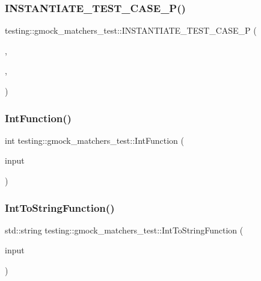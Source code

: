 \subsubsection{\texorpdfstring{INSTANTIATE\_TEST\_CASE\_P()}{INSTANTIATE\_TEST\_CASE\_P()}\hspace{0.1cm}{\footnotesize\ttfamily [3/3]}}
{\footnotesize\ttfamily testing\+::gmock\+\_\+matchers\+\_\+test\+::\+I\+N\+S\+T\+A\+N\+T\+I\+A\+T\+E\+\_\+\+T\+E\+S\+T\+\_\+\+C\+A\+S\+E\+\_\+P (\begin{DoxyParamCaption}\item[{Samples}]{,  }\item[{Bipartite\+Random\+Test}]{,  }\item[{\mbox{\hyperlink{namespacetesting_abd3c87b40c2a0663691c9b617ed5fcc2}{testing\+::\+Values}}(std\+::make\+\_\+pair(5, 10000), std\+::make\+\_\+pair(6, 5000), std\+::make\+\_\+pair(7, 2000), std\+::make\+\_\+pair(8, 500), std\+::make\+\_\+pair(9, 100))}]{ }\end{DoxyParamCaption})}

\mbox{\label{namespacetesting_1_1gmock__matchers__test_a6e957b9dcda1186c6274a8895d1514b5}} 
\subsubsection{\texorpdfstring{IntFunction()}{IntFunction()}}
{\footnotesize\ttfamily int testing\+::gmock\+\_\+matchers\+\_\+test\+::\+Int\+Function (\begin{DoxyParamCaption}\item[{int}]{input }\end{DoxyParamCaption})}

\mbox{\label{namespacetesting_1_1gmock__matchers__test_a94cad49187e6a3cc41d3ea59903214cf}} 
\subsubsection{\texorpdfstring{IntToStringFunction()}{IntToStringFunction()}}
{\footnotesize\ttfamily std\+::string testing\+::gmock\+\_\+matchers\+\_\+test\+::\+Int\+To\+String\+Function (\begin{DoxyParamCaption}\item[{int}]{input }\end{DoxyParamCaption})}

